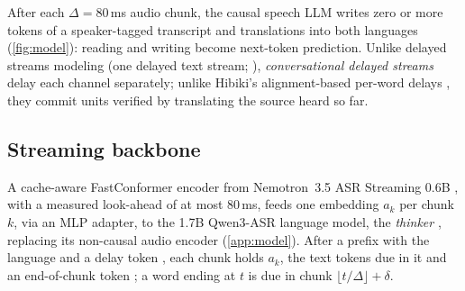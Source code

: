After each $\Delta=80$\,ms audio chunk, the causal speech LLM \model writes zero or more tokens of a speaker-tagged transcript and translations into both languages (\cref{fig:model}): reading and writing become next-token prediction.
Unlike delayed streams modeling (one delayed text stream; \citealp{zeghidour2025streaming}), \emph{conversational delayed streams} delay each channel separately; unlike Hibiki's alignment-based per-word delays \citep{labiausse2025highfidelity}, they commit units verified by translating the source heard so far.

\subsection{Streaming backbone}\label{sec:model-backbone}
A cache-aware FastConformer encoder from Nemotron~3.5 ASR Streaming 0.6B \citep{nvidia2026nemotron35asr}, with a measured look-ahead of at most 80\,ms, feeds one embedding $a_k$ per chunk $k$, via an MLP adapter, to the 1.7B Qwen3-ASR language model, the \emph{thinker} \citep{shi2026qwen3asr}, replacing its non-causal audio encoder (\cref{app:model}).
After a prefix with the language and a delay token , each chunk holds $a_k$, the text tokens due in it and an end-of-chunk token ; a word ending at $t$ is due in chunk $\lfloor t/\Delta\rfloor+\delta$.

